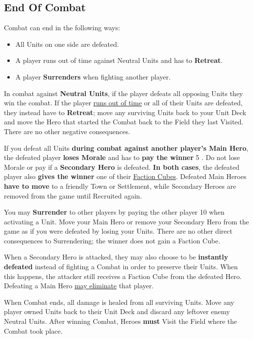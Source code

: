 \begin{multicols}{2}
\subsection*{\hypertarget{Endcombat}{End Of Combat}}
Combat can end in the following ways:
\begin{itemize}
    \item All Units on one side are defeated.
    \item A player runs out of time against Neutral Units and has to \textbf{Retreat}.
    \item A player \textbf{Surrenders} when fighting another player.
\end{itemize}
In combat against \textbf{Neutral Units}, if the player defeats all opposing Units they win the combat.
If the player \hyperlink{Timelimit}{runs out of time} or all of their Units are defeated, they instead have to \textbf{Retreat}; move any surviving Units back to your Unit Deck and move the Hero that started the Combat back to the Field they last Visited.
There are no other negative consequences.\par
{}\par
If you defeat all Units \textbf{during combat against another player's Main Hero}, the defeated player \textbf{loses Morale} and has to \textbf{pay the winner} 5 .
Do not lose Morale or pay  if a \textbf{Secondary Hero} is defeated.
\textbf{In both cases}, the defeated player also \textbf{gives the winner} one of their \hyperlink{End}{Faction Cubes}.
Defeated Main Heroes \textbf{have to move} to a friendly Town or Settlement, while Secondary Heroes are removed from the game until Recruited again.\par
You may \textbf{Surrender} to other players by paying the other player 10  when activating a Unit.
Move your Main Hero or remove your Secondary Hero from the game as if you were defeated by losing your Units.
There are no other direct consequences to Surrendering; the winner does not gain a Faction Cube.\par
{}\par
When a Secondary Hero is attacked, they may also choose to be \textbf{instantly defeated} instead of fighting a Combat in order to preserve their Units.
When this happens, the attacker still receives a Faction Cube from the defeated Hero.
Defeating a Main Hero \hyperlink{End}{may eliminate} that player.\par
When Combat ends, all damage is healed from all surviving Units.
Move any player owned Units back to their Unit Deck and discard any leftover enemy Neutral Units.
After winning Combat, Heroes \textbf{must} Visit the Field where the Combat took place.


\end{multicols}

